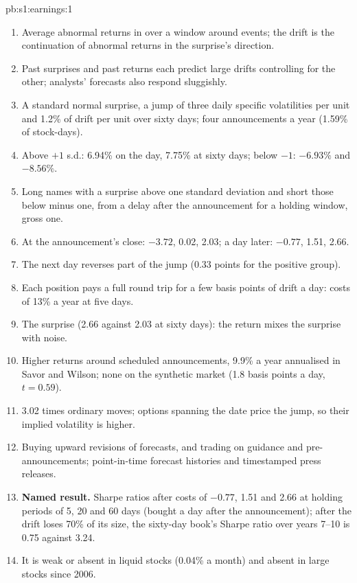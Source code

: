 \begin{solution}{pb:s1:earnings:1}
\begin{enumerate}
\item Average abnormal returns in  over a window around events; the drift is the continuation of abnormal returns in the surprise's direction.
\item Past surprises and past returns each predict large drifts controlling for the other; analysts' forecasts also respond sluggishly.
\item A standard normal surprise, a jump of three daily specific volatilities per unit and 1.2\% of drift per unit over sixty days; four announcements a year
(1.59\% of stock-days).
\item Above $+1$ s.d.: 6.94\% on the day, 7.75\% at sixty days; below $-1$: $-6.93\%$ and $-8.56\%$.
\item Long names with a surprise above one standard deviation and short those below minus one, from a delay after the announcement for a holding window,
gross one.
\item At the announcement's close: $-3.72$, 0.02, 2.03; a day later: $-0.77$, 1.51, 2.66.
\item The next day reverses part of the jump (0.33 points for the positive group).
\item Each position pays a full round trip for a few basis points of drift a day: costs of 13\% a year at five days.
\item The surprise (2.66 against 2.03 at sixty days): the return mixes the surprise with noise.
\item Higher returns around scheduled announcements, 9.9\% a year annualised in Savor and Wilson; none on the synthetic market (1.8 basis points a day, $t =
0.59$).
\item 3.02 times ordinary moves; options spanning the date price the jump, so their implied volatility is higher.
\item Buying upward revisions of forecasts, and trading on guidance and pre-announcements; point-in-time forecast histories and timestamped press releases.
\item \textbf{Named result.} Sharpe ratios after costs of $-0.77$, 1.51 and 2.66 at holding periods of 5, 20 and 60 days (bought a day after the
announcement); after the drift loses 70\% of its size, the sixty-day book's Sharpe ratio over years 7--10 is 0.75 against 3.24.
\item It is weak or absent in liquid stocks (0.04\% a month) and absent in large stocks since 2006.

\end{enumerate}
\end{solution}
